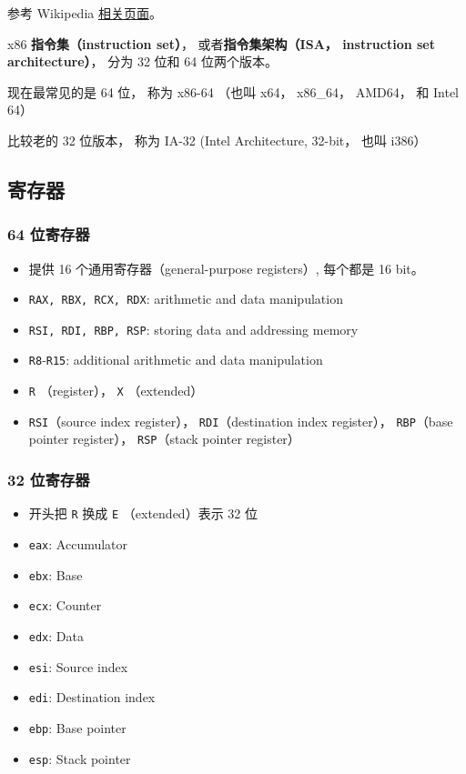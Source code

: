 
\begin{issues}
\issueDraft
\end{issues}

参考 Wikipedia \href{https://en.wikipedia.org/wiki/X86-64}{相关页面}。

x86 \textbf{指令集（instruction set）}， 或者\textbf{指令集架构（ISA， instruction set architecture）}， 分为 32 位和 64 位两个版本。

现在最常见的是 64 位， 称为 x86-64 （也叫 x64， x86_64， AMD64， 和 Intel 64）

比较老的 32 位版本， 称为 IA-32 (Intel Architecture, 32-bit， 也叫 i386）


\subsection{寄存器}
\subsubsection{64 位寄存器}
\begin{itemize}
\item 提供 16 个通用寄存器（general-purpose registers）, 每个都是 16 bit。
\item \verb|RAX, RBX, RCX, RDX|: arithmetic and data manipulation
\item \verb|RSI, RDI, RBP, RSP|: storing data and addressing memory
\item \verb|R8|-\verb|R15|: additional arithmetic and data manipulation
\item \verb|R| （register）， \verb|X| （extended）
\item \verb|RSI|（source index register）， \verb|RDI|（destination index register）， \verb|RBP|（base pointer register）， \verb|RSP|（stack pointer register）
\end{itemize}

\subsubsection{32 位寄存器}
\begin{itemize}
\item 开头把 \verb|R| 换成 \verb|E| （extended）表示 32 位
\item \verb|eax|: Accumulator
\item \verb|ebx|: Base
\item \verb|ecx|: Counter
\item \verb|edx|: Data
\item \verb|esi|: Source index
\item \verb|edi|: Destination index
\item \verb|ebp|: Base pointer
\item \verb|esp|: Stack pointer
\end{itemize}
